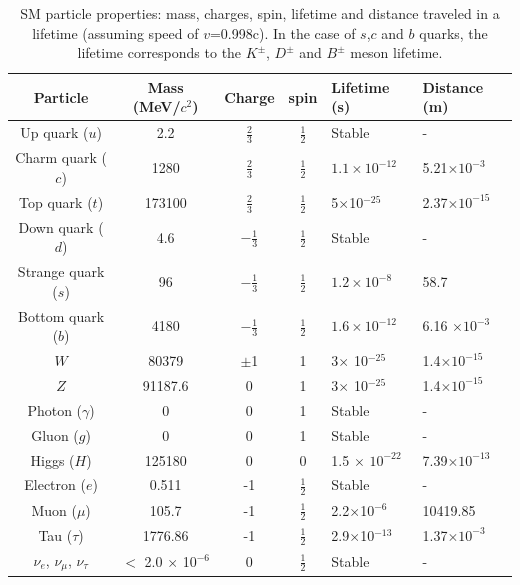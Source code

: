 \begin{table}[htp]
\caption[Table of particles in SM]{SM particle properties: mass, charges, spin, lifetime and distance traveled in a lifetime (assuming speed of $v$=0.998c)\cite{pd}. In the case of $s$,$c$ and $b$ quarks, the lifetime corresponds to the $K^\pm$, $D^{\pm}$ and $B^{\pm}$ meson lifetime.}
\renewcommand{\arraystretch}{1.5}
\begin{tabular}{|c|c|c|c|p{2.5cm}|p{2.5cm}|}
\hline 
Particle& Mass (MeV/$c^2$) &Charge & spin &Lifetime (s) & Distance (m) \\ 
	\hline 
Up quark ($u$)	& 2.2 & $\frac{2}{3}$ & $\frac{1}{2}$ & Stable & -\\ 
	\hline 
Charm quark ($c$)	& 1280 &$\frac{2}{3}$ & $\frac{1}{2}$ & $ 1.1 \times 10^{-12}$ & 5.21$\times 10^{-3}$ \\ 
	\hline 
Top	quark ($t$)& 173100 & $\frac{2}{3}$ & $\frac{1}{2}$ & 5$\times$10$^{-25}$ &2.37$\times 10^{-15}$  \\ 
	\hline 
Down quark ($d$)	& 4.6 &$-\frac{1}{3}$ & $\frac{1}{2}$ & Stable & - \\ 
	\hline 
Strange quark ($s$)	& 96 &$-\frac{1}{3}$ & $\frac{1}{2}$ &$1.2 \times 10^{-8}$ & 58.7 \\ 
	\hline 
Bottom quark ($b$)	& 4180 &$-\frac{1}{3}$ & $\frac{1}{2}$ &$1.6 \times 10^{-12}$  & 6.16 $\times 10^{-3}$\\ 
	\hline 
$W$ 	& 80379 &$\pm$1 & 1 & 3$\times$ 10$^{-25}$ & 1.4$\times 10^{-15}$\\ 
	\hline 
$Z$ & 91187.6 &0 & 1 & 3$\times$ 10$^{-25}$ &1.4$\times 10^{-15}$ \\ 
\hline
Photon ($\gamma$) & 0 &0 & 1&Stable & - \\ 
\hline
Gluon ($g$)	& 0 &0 & 1&Stable & - \\ 
	\hline 
Higgs ($H$)	& 125180 &0 & 0& 1.5 $\times$ $10^{-22}$ & 7.39$\times 10^{-13}$ \\ 
	\hline 
Electron ($e$)& 0.511 & -1 &  $\frac{1}{2}$& Stable & - \\ 
	\hline 
Muon ($\mu$)	& 105.7 & -1 & $\frac{1}{2}$ & 2.2$\times$10$^{-6}$ & 10419.85 \\ 
	\hline 
Tau ($\tau$)	& 1776.86 &-1 & $\frac{1}{2}$ & 2.9$\times$10$^{-13}$ & 1.37$\times 10^{-3}$\\ 
	\hline 
$\nu_e$, $\nu_\mu$, $\nu_\tau$&  $<$ 2.0 $\times$ 10$^{-6}$ & 0 & $\frac{1}{2}$ & Stable & -\\
	\hline 
\end{tabular} 
\label{SM table}
\end{table}

